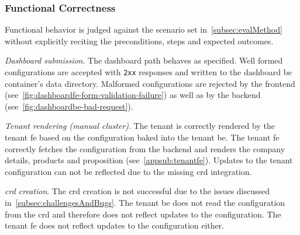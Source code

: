\documentclass[11pt, a4paper, oneside, listof=totoc]{scrartcl}
\begin{document}
            \subsubsection{Functional Correctness}\label{subsubsec:functionalCorrectness}
                Functional behavior is judged against the scenario set 
                in~\autoref{subsec:evalMethod} without explicitly reciting the preconditions, steps
                and expected outcomes.
                \begin{enumerate}[label={[\arabic*]:},
                    ref=Challenge~\arabic*,
                    leftmargin=*,
                    itemsep=0.6\baselineskip]

                    \item\label{chal:fcdashboardSubmission}
                        \textit{Dashboard submission}.
                        The dashboard path behaves as specified. Well formed configurations are
                        accepted with \texttt{2xx} responses and written to the dashboard \gls{be}
                        container's data directory.
                        Malformed configurations are rejected by the frontend
                        (see~\autoref{fig:dashboardfe-form-validation-failure}) as well as by the
                        backend (see~\autoref{fig:dashboardbe-bad-request}).

                    \item\label{chal:fctenantRendering}
                        \textit{Tenant rendering (manual cluster)}.
                        The tenant is correctly rendered by the tenant \gls{fe} based on the
                        configuration baked into the tenant \gls{be}.
                        The tenant \gls{fe} correctly fetches the configuration from the backend
                        and renders the company details, products and proposition
                        (see~\autoref{appsub:tenantfe}).
                        Updates to the tenant configuration can not be reflected due to the missing
                        \gls{crd} integration.

                    \item\label{chal:fcCRD}
                        \textit{\gls{crd} creation}.
                        The \gls{crd} creation is not successful due to the issues discussed
                        in~\autoref{subsec:challengesAndBugs}.
                        The tenant \gls{be} does not read the configuration from the \gls{crd} and
                        therefore does not reflect updates to the configuration.
                        The tenant \gls{fe} does not reflect updates to the configuration either.
            \end{enumerate}
                
\end{document}
